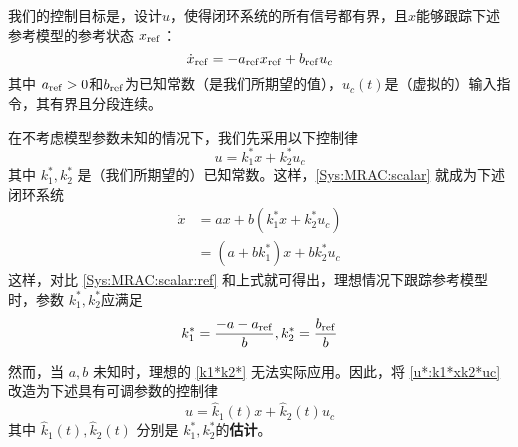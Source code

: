 我们的控制目标是，设计$u$，使得闭环系统的所有信号都有界，且$x$能够跟踪下述参考模型的参考状态 $x_{\operatorname{ref}}$：
\begin{equation}
  \dot{x}_{\operatorname{ref}} = - a_{\operatorname{ref}} x_{\operatorname{ref}} + b_{\operatorname{ref}} u_c \label{Sys:MRAC:scalar:ref}
\end{equation}
其中 $a_{\operatorname{ref}} > 0$和$b_{\operatorname{ref}}$为已知常数（是我们所期望的值），$u_c(t)$是（虚拟的）输入指令，其有界且分段连续。

在不考虑模型参数未知的情况下，我们先采用以下控制律
\begin{equation}
  u = k^{\ast}_1 x + k^{\ast}_2 u_c \label{u*:k1*xk2*uc}
\end{equation}
其中 $k^{\ast}_1, k^{\ast}_2$ 是（我们所期望的）已知常数。这样，\eqref{Sys:MRAC:scalar} 就成为下述闭环系统
\begin{align*}
  \dot{x} & = a  x + b  (k^{\ast}_1 x + k^{\ast}_2 u_c)  \\
          & = (a + b  k^{\ast}_1)  x + b  k^{\ast}_2 u_c
\end{align*}
这样，对比 \eqref{Sys:MRAC:scalar:ref} 和上式就可得出，理想情况下跟踪参考模型时，参数
$k^{\ast}_1, k^{\ast}_2$应满足
\begin{equation}
  k^{\ast}_1 = \frac{-a - a_{\operatorname{ref}}}{b}, k^{\ast}_2 = \frac{b_{\operatorname{ref}}}{b} \label{k1*k2*}
\end{equation}

然而，当 $a, b$ 未知时，理想的 \eqref{k1*k2*} 无法实际应用。因此，将 \eqref{u*:k1*xk2*uc} 改造为下述具有可调参数的控制律
\begin{equation}
  u = \hat{k}_1 (t) x + \hat{k}_2 (t) u_c \label{u:k1xk2uc}
\end{equation}
其中 $\hat{k}_1 (t), \hat{k}_2 (t)$ 分别是 $k^{\ast}_1,k^{\ast}_2$的{\bf 估计}。

